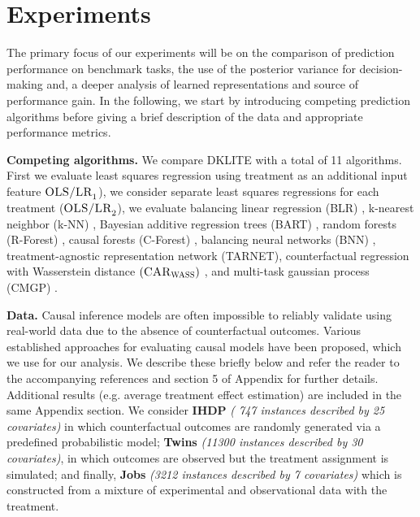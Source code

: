 \documentclass[twoside]{article}
\begin{document}
\section{Experiments}
The primary focus of our experiments will be on the comparison of prediction performance on benchmark tasks, the use of the posterior variance for decision-making and, a deeper analysis of learned representations and source of performance gain. In the following, we start by introducing competing prediction algorithms before giving a brief description of the data and appropriate performance metrics.

\textbf{Competing algorithms.} We compare DKLITE with a total of 11 algorithms. First we evaluate least squares regression using treatment as an additional input feature $\textsc{OLS/LR}_1$), we consider separate least squares regressions for each treatment ($\textsc{OLS/LR}_2$), we evaluate balancing linear regression (BLR) \cite{johansson2016learning}, k-nearest neighbor (k-NN) \cite{crump2008nonparametric}, Bayesian additive regression trees (BART) \cite{chipman2010bart}, random forests (R-Forest) \cite{breiman2001random}, causal forests (C-Forest) \cite{wager2018estimation}, balancing neural networks (BNN) \cite{johansson2016learning}, treatment-agnostic representation network (TARNET), counterfactual regression with Wasserstein distance $(\textsc{CAR}_{\textsc{WASS}})$ \cite{shalit2017estimating}, and multi-task gaussian process (CMGP) \cite{alaa2017bayesian}.

\textbf{Data.} Causal inference models are often impossible to reliably validate using real-world data due to the absence of counterfactual outcomes. Various established approaches for evaluating causal models have been proposed, which we use for our analysis. We describe these briefly below and refer the reader to the accompanying references and section 5 of Appendix for further details. Additional results (e.g. average treatment effect estimation) are included in the same Appendix section. We consider \textbf{IHDP} \textit{( 747 instances described by 25 covariates)} \cite{hill2011bayesian,alaa2017bayesian,shalit2017estimating, yao2018representation} in which counterfactual outcomes are randomly generated via a predefined probabilistic model; \textbf{Twins} \textit{(11300 instances described by 30 covariates)}, in which outcomes are observed but the treatment assignment is simulated; and finally, \textbf{Jobs} \textit{(3212 instances described by 7 covariates)} \cite{shalit2017estimating,lalonde1986evaluating,dehejia2002propensity} which is constructed from a mixture of experimental and observational data with the treatment. 
\end{document}
